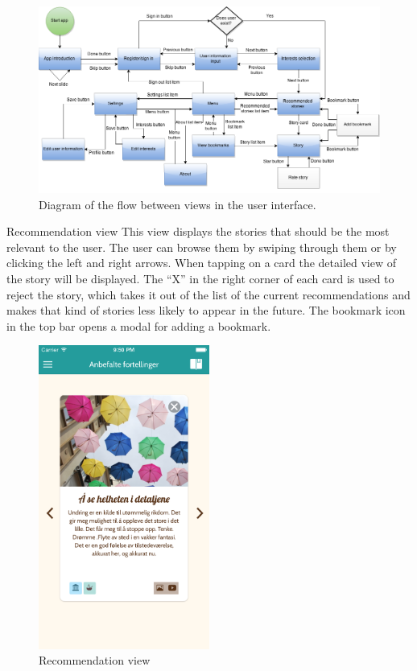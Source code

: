 \begin{figure}[h!]
	\centering
	\includegraphics[width=\textwidth]{fig/flow_diagram}
	\caption{Diagram of the flow between views in the user interface.}
	\label{Fig:flow_diagram}
\end{figure}


Recommendation view\newline
This view displays the stories that should be the most relevant to the user. The user can browse them by swiping through them or by clicking the left and right arrows. When tapping on a card the detailed view of the story will be displayed. The “X” in the right corner of each card is used to reject the story, which takes it out of the list of the current recommendations and makes that kind of stories less likely to appear in the future. The bookmark icon in the top bar opens a modal for adding a bookmark. 

\begin{figure}[h!]
	\centering
	\includegraphics[width=0.5\textwidth]{fig/recommendation_view}
	\caption{Recommendation view}
	\label{Fig:recommendation_view}
\end{figure}

